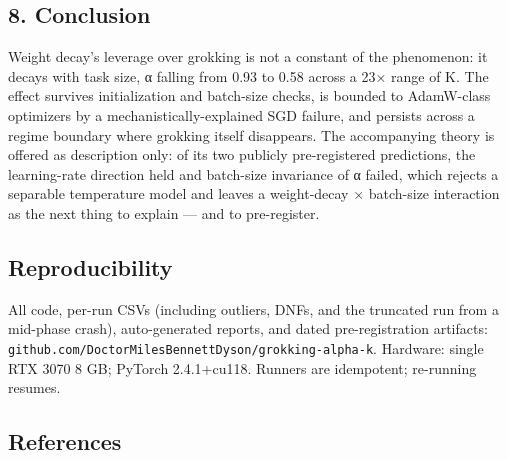 \documentclass[
  11pt,
]{article}
\begin{document}
\subsection{8. Conclusion}\label{conclusion}

Weight decay's leverage over grokking is not a constant of the
phenomenon: it decays with task size, \textbar α\textbar{} falling from
0.93 to 0.58 across a 23× range of K. The effect survives initialization
and batch-size checks, is bounded to AdamW-class optimizers by a
mechanistically-explained SGD failure, and persists across a regime
boundary where grokking itself disappears. The accompanying theory is
offered as description only: of its two publicly pre-registered
predictions, the learning-rate direction held and batch-size invariance
of α failed, which rejects a separable temperature model and leaves a
weight-decay × batch-size interaction as the next thing to explain ---
and to pre-register.

\subsection{Reproducibility}\label{reproducibility}

All code, per-run CSVs (including outliers, DNFs, and the truncated run
from a mid-phase crash), auto-generated reports, and dated
pre-registration artifacts:
\texttt{github.com/DoctorMilesBennettDyson/grokking-alpha-k}. Hardware:
single RTX 3070 8 GB; PyTorch 2.4.1+cu118. Runners are idempotent;
re-running resumes.

\subsection{References}\label{references}
\end{document}
